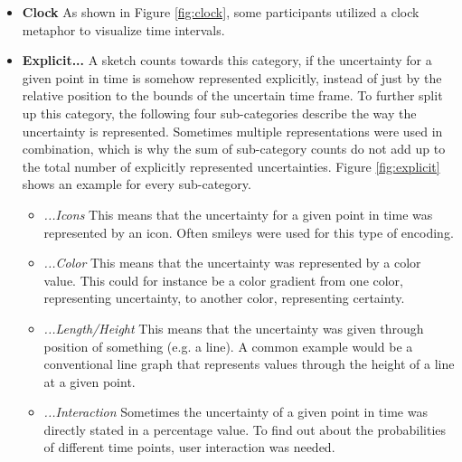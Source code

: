 \begin{itemize}
	\item \textbf{Clock} As shown in Figure \ref{fig:clock}, some participants utilized a clock metaphor to visualize time intervals.
	
	\item \textbf{Explicit...} A sketch counts towards this category, if the uncertainty for a given point in time is somehow represented explicitly, instead of just by the relative position to the bounds of the uncertain time frame. To further split up this category, the following four sub-categories describe the way the uncertainty is represented. Sometimes multiple representations were used in combination, which is why the sum of sub-category counts do not add up to the total number of explicitly represented uncertainties. Figure \ref{fig:explicit} shows an example for every sub-category.
	\begin{itemize}
		\item \textit{...Icons} This means that the uncertainty for a given point in time was represented by an icon. Often smileys were used for this type of encoding.
		\item \textit{...Color} This means that the uncertainty was represented by a color value. This could for instance be a color gradient from one color, representing uncertainty, to another color, representing certainty. 
		\item \textit{...Length/Height} This means that the uncertainty was given through position of something (e.g. a line). A common example would be a conventional line graph that represents values through the height of a line at a given point.
		\item \textit{...Interaction} Sometimes the uncertainty of a given point in time was directly stated in a percentage value. To find out about the probabilities of different time points, user interaction was needed.
		

\end{itemize}
\end{itemize}

